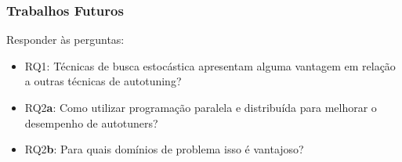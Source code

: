 \documentclass[10pt, compress]{beamer}
\begin{document}
\begin{frame}[fragile]
    \frametitle{Trabalhos Futuros}
    Responder às perguntas:
    \begin{itemize}
        \item \alert{RQ1}: Técnicas de busca estocástica apresentam
            alguma vantagem em relação a outras técnicas de autotuning?
            \pause
        \item \alert{RQ2\textbf{a}}: Como utilizar programação paralela e
            distribuída para melhorar o desempenho de autotuners?
            \pause
        \item \alert{RQ2\textbf{b}}: Para quais domínios de problema isso é
            vantajoso?
    \end{itemize}
\end{frame}


\maketitle
\end{document}
